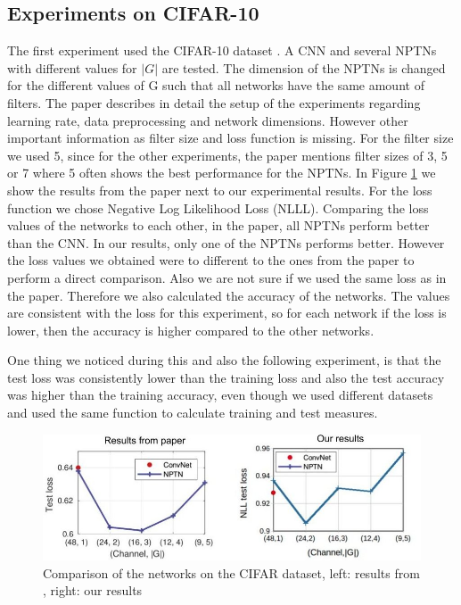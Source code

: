\documentclass{llncs}
\begin{document}
\subsection{Experiments on CIFAR-10}
The first experiment used the CIFAR-10 dataset \cite{CIFAR}. A CNN and several NPTNs with different values for $|G|$ are tested. The dimension of the NPTNs is changed for the different values of G such that all networks have the same amount of filters.
The paper describes in detail the setup of the experiments regarding learning rate, data preprocessing and network dimensions. However other important information as filter size and loss function is missing. 
For the filter size we used 5, since for the other experiments, the paper mentions  filter sizes of 3, 5 or 7 where 5 often shows the best performance for the NPTNs. 
In Figure \ref{pic:first_experiment} we show the results from the paper next to our experimental results. For the loss function we chose Negative Log Likelihood Loss (NLLL). 
Comparing the loss values of the networks to each other, in the paper, all NPTNs perform better than the CNN. In our results, only one of the NPTNs performs better.
However the loss values we obtained were to different to the ones from the paper to perform a direct comparison. 
Also we are not sure if we used the same loss as in the paper.  Therefore we also calculated the accuracy of the networks. The values are consistent with the loss for this experiment, so for each network if the loss is lower, then the accuracy is higher compared to the other networks.

One thing we noticed during this and also the following experiment, is that the test loss was consistently lower than the training loss and also the test accuracy was higher than the training accuracy, even though we used different datasets and used the same function to calculate training and test measures.

\begin{figure}
	\begin{center}
	\includegraphics[scale=0.35]{result_images/experiment1.jpg}
	\caption{Comparison of the networks on the CIFAR dataset, left: results from \citep{NPTN18}, right: our results}
	\label{pic:first_experiment}
	\end{center}
\end{figure}
\end{document}
